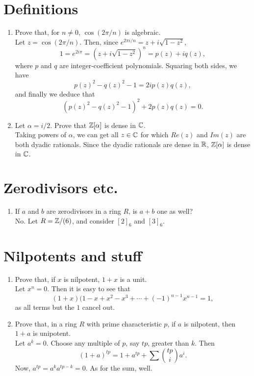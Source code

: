 \documentclass[13pt]{article}
\newcommand{\C}{\Bbb C}
\newcommand{\Z}{\Bbb Z}
\newcommand{\R}{\Bbb R}
\begin{document}
\section{Definitions}
\begin{enumerate}
\item Prove that, for $n\neq 0$, $\cos(2\pi/n)$ is algebraic.\\
Let $z = \cos(2\pi/n)$. Then, since $e^{2\pi i/n}=z+i\sqrt{1-z^2}$,
\[1=e^{2i\pi}=(z+i\sqrt{1-z^2})^n=p(z)+iq(z),\] where $p$ and $q$ are
integer-coefficient polynomials. Squaring both sides, we have \[p(z)^2 - q(z)^2 -
1 = 2i p(z)q(z),\] and finally we deduce that \[(p(z)^2 - q(z)^2 - 1)^2 +
  2p(z)q(z) = 0.\]

\item Let $\alpha = i/2$. Prove that $\Z[\alpha]$ is dense in $\C$.\\
Taking powers of $\alpha$, we can get all $z\in\C$ for which $Re(z)$ and $Im(z)$
are both dyadic rationals. Since the dyadic rationals are dense in $\R$,
$\Z[\alpha]$ is dense in $\C$. 

\end{enumerate}

\section{Zerodivisors etc.}
\begin{enumerate}
\item If $a$ and $b$ are zerodivisors in a ring $R$, is $a+b$ one as well?\\
No. Let $R=\Z/(6)$, and consider $[2]_6$ and $[3]_6$.
\end{enumerate}

\section{Nilpotents and stuff}
\begin{enumerate}
\item Prove that, if $x$ is nilpotent, $1+x$ is a unit.\\
Let $x^n = 0$. Then it is easy to see that \[(1+x)(1-x+x^2-x^3
  +\cdots+(-1)^{n-1}x^{n-1} = 1,\] as all terms but the $1$ cancel out.

\item Prove that, in a ring $R$ with prime characteristic $p$, if $a$ is
  nilpotent, then $1+a$ is unipotent.\\
Let $a^k=0$. Choose any multiple of $p$, say $tp$, greater than $k$. Then
\[(1+a)^{tp} = 1 + a^{tp} + \sum\binom{tp}{i}a^i.\]
Now, $a^{tp} = a^ka^{tp-k} = 0$.
As for the sum, well. 
\end{enumerate}
\end{document}
